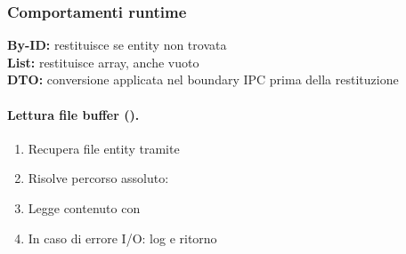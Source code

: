 \subsubsection{Comportamenti runtime}
\label{sec:browsing:runtime}

\noindent
\textbf{By-ID:} restituisce  se entity non trovata\\
\textbf{List:} restituisce array, anche vuoto\\
\textbf{DTO:} conversione applicata nel boundary IPC prima della restituzione

\paragraph{Lettura file buffer ().}
\begin{enumerate}[labelwidth=0.8cm,leftmargin=1cm]
  \item Recupera file entity tramite 
  \item Risolve percorso assoluto: 
  \item Legge contenuto con 
  \item In caso di errore I/O: log e ritorno 
\end{enumerate}


\newpage